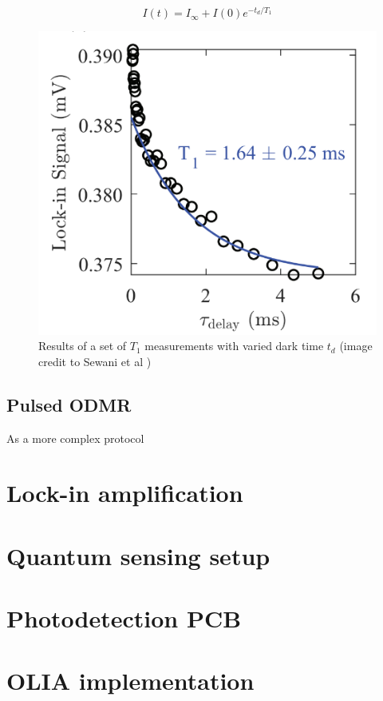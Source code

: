 \begin{equation}\label{eq:t1}
I(t)=I_\infty+I(0)e^{-t_d/T_1}
\end{equation}



\begin{figure}[ht]
	\centering
	\includegraphics[width=0.7\linewidth]{img/t1_result}
	\caption{Results of a set of $T_1$ measurements with varied dark time $t_d$ (image credit to Sewani et al \cite{sewani2020coherent})}
	\label{fig:t1result}
\end{figure}



\subsection{Pulsed ODMR}
As a more complex protocol

\section{Lock-in amplification} \label{chap:lockin}
\section{Quantum sensing setup}
\section{Photodetection PCB}
\section{OLIA implementation}
